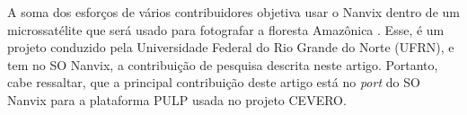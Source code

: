 A soma dos esforços de vários contribuidores objetiva usar o Nanvix dentro de um microssatélite que será usado para fotografar a floresta Amazônica \cite{RepoCervero}. Esse, é um projeto conduzido pela Universidade Federal do Rio Grande do Norte (UFRN), e tem no SO Nanvix, a contribuição de pesquisa descrita neste artigo. Portanto, cabe ressaltar, que a principal contribuição deste artigo está no \textit{port} do SO Nanvix para a plataforma PULP usada no projeto CEVERO.
